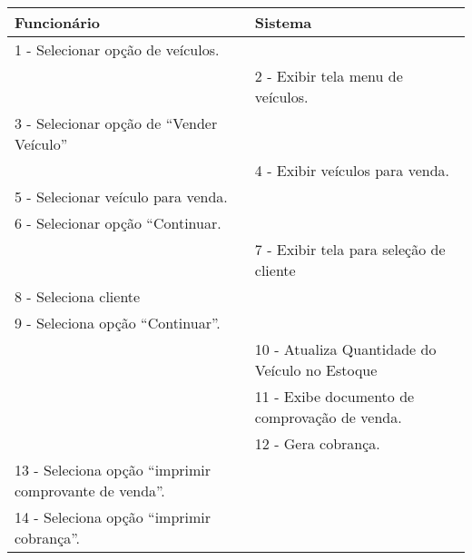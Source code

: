 \begin{tabular}{|p{7cm}|p{7cm}|}
	\hline 
	
	
	Funcionário
	& 
	
	Sistema
	\\ 
	\hline 
	
	
	1 - Selecionar opção de veículos.
	&  \\ 
	\hline 
	& 
	
	2 - Exibir tela menu de veículos.
	\\ 
	\hline 
	
	
	3 - Selecionar opção de “Vender Veículo”
	&  \\ 
	\hline 
	& 
	
	4 - Exibir veículos para venda.
	\\ 
	\hline 
	
	
	5 - Selecionar veículo para venda.
	&  \\ 
	\hline 
	
	
	6 - Selecionar opção “Continuar.
	&  \\ 
	\hline 
	& 
	
	7 - Exibir tela para seleção de cliente
	\\ 
	\hline 
	
	
	8 - Seleciona cliente
	&  \\ 
	\hline 
	
	
	9 - Seleciona opção “Continuar”. 
	&  \\ 
	\hline 
	& 
	
	10 - Atualiza Quantidade do Veículo no Estoque
	\\ 
	\hline 
	& 
	
	11 - Exibe documento de comprovação de venda. 
	\\ 
	\hline 
	& 
	
	12 - Gera cobrança.
	\\ 
	\hline 
	
	
	13 - Seleciona opção “imprimir comprovante de venda”.
	&  \\ 
	\hline 
	
	
	14 - Seleciona opção “imprimir cobrança”.
	&  \\ 
	\hline 
\end{tabular}  



